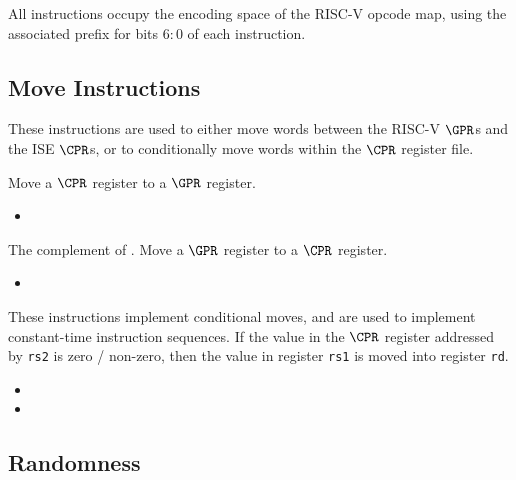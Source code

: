 
All instructions occupy the \encspace encoding space of the RISC-V opcode
map, using the associated \encopcode prefix for bits $6:0$ of each 
instruction.

\subsection{Move Instructions}
\label{sec:move-instructions}

These instructions are used to either move words between the RISC-V $\GPR$s
and the ISE $\CPR$s, or to conditionally move words within the $\CPR$
register file.

{\iencmvtwogpr}
{
    Move a $\CPR$ register to a $\GPR$ register.
}
{
\begin{itemize}
\item {}
\end{itemize}
}{
    }

{\iencmvtwocop}
{
The complement of .
Move a $\GPR$ register to a $\CPR$ register.
}{
\begin{itemize}
\item {}
\end{itemize}
}{
}

{\ienccmovcr\ienccmovncr}
{
These instructions implement conditional moves, and are used to implement
constant-time instruction sequences.
If the value in the $\CPR$ register addressed by {\tt rs2} is
zero / non-zero, then the value in register {\tt rs1} is moved
into register {\tt rd}.
}{
\begin{itemize}
\item {}
\item {}
\end{itemize}
}{
}


\subsection{Randomness}

